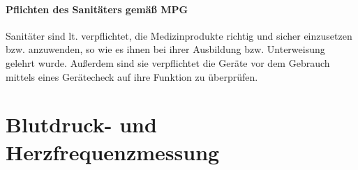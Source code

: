 \paragraph{Pflichten des Sanitäters gemäß MPG}

Sanitäter sind lt.  verpflichtet, die
Medizinprodukte richtig und sicher einzusetzen bzw. anzuwenden, so wie es
ihnen bei ihrer Ausbildung bzw. Unterweisung gelehrt wurde.
Außerdem sind sie verpflichtet die Geräte vor dem Gebrauch
mittels eines Gerätecheck auf ihre Funktion zu überprüfen.

\section{Blutdruck- und Herzfrequenzmessung}

\label{topic:rr-messung}

